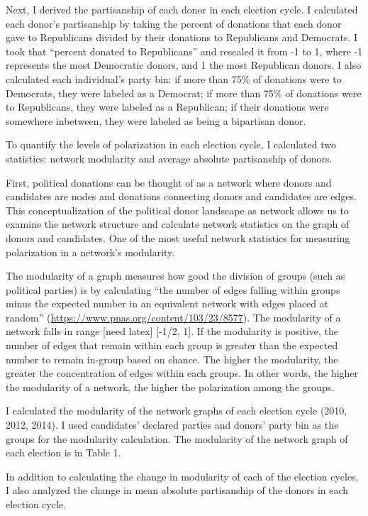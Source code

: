 \documentclass[11pt,]{article}
\begin{document}
Next, I derived the partisanship of each donor in each election cycle. I
calculated each donor's partisanship by taking the percent of donations
that each donor gave to Republicans divided by their donations to
Republicans and Democrats. I took that ``percent donated to
Republicans'' and rescaled it from -1 to 1, where -1 represents the most
Democratic donors, and 1 the most Republican donors. I also calculated
each individual's party bin: if more than 75\% of donations were to
Democrats, they were labeled as a Democrat; if more than 75\% of
donations were to Republicans, they were labeled as a Republican; if
their donations were somewhere inbetween, they were labeled as being a
bipartisan donor.

To quantify the levels of polarization in each election cycle, I
calculated two statistics: network modularity and average absolute
partisanship of donors.

First, political donations can be thought of as a network where donors
and candidates are nodes and donations connecting donors and candidates
are edges. This conceptualization of the political donor landscape as
network allows us to examine the network structure and calculate network
statistics on the graph of donors and candidates. One of the most useful
network statistics for measuring polarization in a network's modularity.

The modularity of a graph measures how good the division of groups (such
as political parties) is by calculating ``the number of edges falling
within groups minus the expected number in an equivalent network with
edges placed at random''
(\url{https://www.pnas.org/content/103/23/8577}). The modularity of a
network falls in range {[}need latex{]} {[}-1/2, 1{]}. If the modularity
is positive, the number of edges that remain within each group is
greater than the expected number to remain in-group based on chance. The
higher the modularity, the greater the concentration of edges within
each groups. In other words, the higher the modularity of a network, the
higher the polarization among the groups.

I calculated the modularity of the network graphs of each election cycle
(2010, 2012, 2014). I used candidates' declared parties and donors'
party bin as the groups for the modularity calculation. The modularity
of the network graph of each election is in Table 1.

In addition to calculating the change in modularity of each of the
election cycles, I also analyzed the change in mean absolute
partisanship of the donors in each election cycle.
\end{document}
